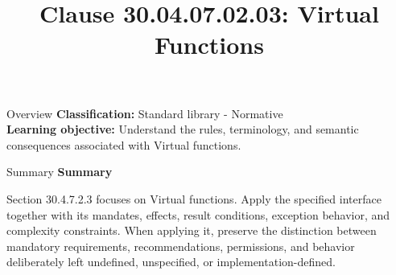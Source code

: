 \documentclass[10pt,letterpaper]{article}
\title{Clause 30.04.07.02.03: Virtual Functions}
\author{}
\date{}
\begin{document}
\maketitle
\begin{CornellOverviewBox}{Overview}
\textbf{Classification:} Standard library - Normative\\[2pt]
\textbf{Learning objective:} Understand the rules, terminology, and semantic consequences associated with Virtual functions.
\end{CornellOverviewBox}\begin{CornellSummaryBox}{Summary}
{\sffamily\bfseries\color{Accent} Summary}\par\vspace{3pt}Section 30.4.7.2.3 focuses on Virtual functions. Apply the specified interface together with its mandates, effects, result conditions, exception behavior, and complexity constraints. When applying it, preserve the distinction between mandatory requirements, recommendations, permissions, and behavior deliberately left undefined, unspecified, or implementation-defined.
\end{CornellSummaryBox}
\end{document}
